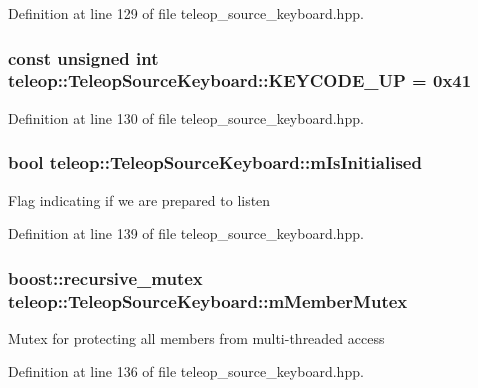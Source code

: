 Definition at line 129 of file teleop\_\-source\_\-keyboard.hpp.

\subsubsection[{KEYCODE\_\-UP}]{\setlength{\rightskip}{0pt plus 5cm}const unsigned int {\bf teleop::TeleopSourceKeyboard::KEYCODE\_\-UP} = 0x41\hspace{0.3cm}{\ttfamily  [static, private]}}\label{classteleop_1_1TeleopSourceKeyboard_a4da8566192b9c90e07f9bc1bf283d1d4}


Definition at line 130 of file teleop\_\-source\_\-keyboard.hpp.

\subsubsection[{mIsInitialised}]{\setlength{\rightskip}{0pt plus 5cm}bool {\bf teleop::TeleopSourceKeyboard::mIsInitialised}\hspace{0.3cm}{\ttfamily  [private]}}\label{classteleop_1_1TeleopSourceKeyboard_a83ec820735c831ac44344094548a7ccf}
Flag indicating if we are prepared to listen 

Definition at line 139 of file teleop\_\-source\_\-keyboard.hpp.

\subsubsection[{mMemberMutex}]{\setlength{\rightskip}{0pt plus 5cm}boost::recursive\_\-mutex {\bf teleop::TeleopSourceKeyboard::mMemberMutex}\hspace{0.3cm}{\ttfamily  [private]}}\label{classteleop_1_1TeleopSourceKeyboard_a16e92fa0ca9ba2c2338c7a32778d482e}
Mutex for protecting all members from multi-\/threaded access 

Definition at line 136 of file teleop\_\-source\_\-keyboard.hpp.

